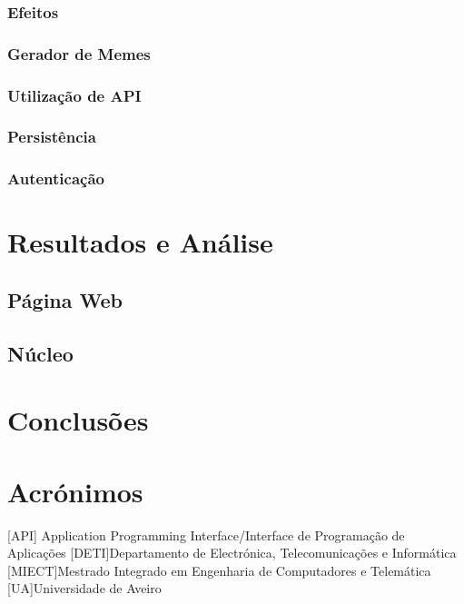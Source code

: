 \documentclass{report}
\begin{document}
\subsection{Efeitos}

\subsection{Gerador de Memes}

\subsection{Utilização de API}

\subsection{Persistência}

\subsection{Autenticação}

\chapter{Resultados e Análise}
\label{chap.res}

\section{Página Web}

\section{Núcleo}


\chapter{Conclusões}
\label{chap.conc}



\chapter*{Acrónimos}
\begin{acronym}
 [API] {Application Programming Interface/Interface de Programação de Aplicações}
 [DETI]{Departamento de Electrónica, Telecomunicações e Informática}
 [MIECT]{Mestrado Integrado em Engenharia de Computadores e Telemática}
 [UA]{Universidade de Aveiro}
\end{acronym}


%
\end{document}
